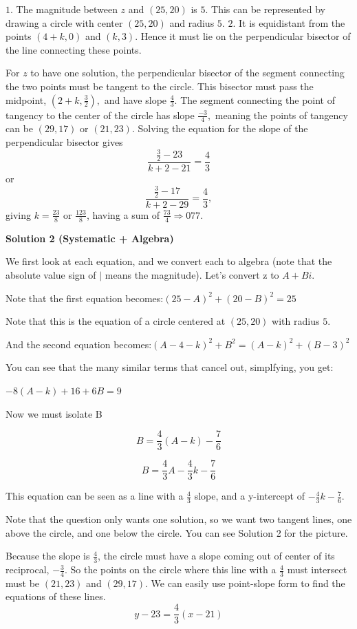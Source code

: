 \begin{enumerate}
 $1.$ The magnitude between $z$ and $(25,20)$ is $5.$ This can be represented by drawing a circle with center $(25,20)$ and radius $5.$
$2.$ It is equidistant from the points $(4+k,0)$ and $(k,3).$ Hence it must lie on the perpendicular bisector of the line connecting these points. 

 
For $z$ to have one solution, the perpendicular bisector of the segment connecting the two points must be tangent to the circle. This bisector must pass the midpoint, $(2+k,\frac{3}{2}),$ and have slope $\frac{4}{3}.$ The segment connecting the point of tangency to the center of the circle has slope $\frac{-3}{4},$ meaning the points of tangency can be $(29,17)$ or $(21,23).$ Solving the equation for the slope of the perpendicular bisector gives 
 \[\frac{\frac{3}{2}-23}{k+2-21}=\frac{4}{3}\] or 
 \[\frac{\frac{3}{2}-17}{k+2-29}=\frac{4}{3},\] giving $k=\frac{23}{8}$ or $\frac{123}{8}$, having a sum of $\frac{73}{4} \Longrightarrow \boxed{077}.$




\textbf{Solution 2 (Systematic + Algebra)}

We first look at each equation, and we convert each to algebra (note that the absolute value sign of $|$ means the magnitude). Let's convert z to $A + Bi$.

 
Note that the first equation becomes:$(25 - A)^2 + (20 - B)^2 = 25$

 Note that this is the equation of a circle centered at $(25, 20)$ with radius $5$.

 
And the second equation becomes:$(A-4-k)^2 + B^2 = (A - k)^2 + (B-3)^2$

 You can see that the many similar terms that cancel out, simplfying, you get:

 $-8(A - k) + 16 + 6B = 9$

 Now we must isolate B

 
 \[B= \frac{4}{3}(A-k) - \frac{7}{6}\]

 \[B = \frac{4}{3}A - \frac{4}{3}k - \frac{7}{6}\]

 This equation can be seen as a line with a $\frac{4}{3}$ slope, and a y-intercept of $- \frac{4}{3}k - \frac{7}{6}$. 

 Note that the question only wants one solution, so we want two tangent lines, one above the circle, and one below the circle. You can see Solution 2 for the picture.

 Because the slope is $\frac{4}{3}$, the circle must have a slope coming out of center of its reciprocal, $-\frac{3}{4}$. So the points on the circle where this line with a $\frac{4}{3}$ must intersect must be $(21, 23)$ and $(29, 17)$. We can easily use point-slope form to find the equations of these lines. 
 \[y - 23 = \frac{4}{3}(x - 21)\]


\end{enumerate}

